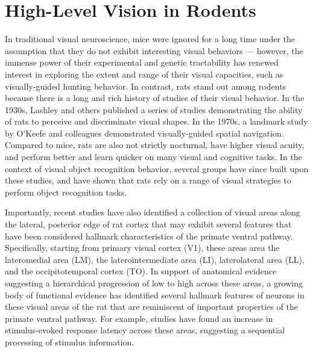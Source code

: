 \section{High-Level Vision in Rodents}
In traditional visual neuroscience, mice were ignored for a long time under the assumption that they do not exhibit interesting visual behaviors --- however, the immense power of their experimental and genetic tractability has renewed interest in exploring the extent and range of their visual capacities, such as visually-guided hunting behavior\cite{Hoy2016, Meyer2020, Michaiel2020}. In contrast, rats stand out among rodents because there is a long and rich history of studies of their visual behavior. In the 1930s, Lashley and others published a series of studies demonstrating the ability of rats to perceive and discriminate visual shapes\cite{Lashley1912, Lashley1930a, Lashley1938}. In the 1970s, a landmark study by O'Keefe and colleagues demonstrated visually-guided spatial navigation\cite{OKeefe1971}. Compared to mice, rats are also not strictly nocturnal, have higher visual acuity\cite{Prusky2000}, and perform better and learn quicker on many visual and cognitive tasks\cite{Whishaw1995}. In the context of visual object recognition behavior, several groups have since built upon these studies, and have shown that rats rely on a range of visual strategies to perform object recognition tasks\cite{Zoccolan2009, Tafazoli2012Transformation-TolerantPriming, Vermaercke2012, Alemi-Neissi2013MultifeaturalRecognition, Vinken2014}.

Importantly, recent studies have also identified a collection of visual areas along the lateral, posterior edge of rat cortex that may exhibit several features that have been considered hallmark characteristics of the primate ventral pathway. Specifically, starting from primary visual cortex (V1), these areas area the lateromedial area (LM), the laterointermediate area (LI), laterolateral area (LL), and the occipitotemporal
cortex (TO). In support of anatomical evidence suggesting a hierarchical progression of low to high across these areas\cite{Coogan1993, Wang2012NetworkCortex, DSouza2020CanonicalHierarchy}, a growing body of functional evidence has identified several hallmark features of neurons in these visual areas of the rat that are reminiscent of important properties of the primate ventral pathway. For example, studies have found an increase in stimulus-evoked response latency across these areas\cite{Vermaercke2014, DSouza2020}, suggesting a sequential processing of stimulus information.

